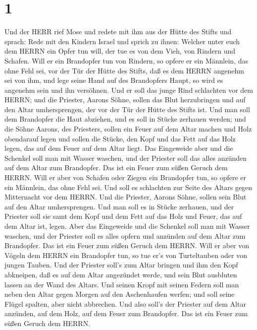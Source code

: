 \hypertarget{section}{%
\section{1}\label{section}}

 Und der HERR rief Mose und redete mit ihm aus der Hütte des
Stifts und sprach:  Rede mit den Kindern Israel und sprich
zu ihnen: Welcher unter euch dem HERRN ein Opfer tun will, der tue es
von dem Vieh, von Rindern und Schafen.  Will er ein
Brandopfer tun von Rindern, so opfere er ein Männlein, das ohne Fehl
sei, vor der Tür der Hütte des Stifts, daß es dem HERRN angenehm sei von
ihm,  und lege seine Hand auf des Brandopfers Haupt, so wird
es angenehm sein und ihn versöhnen.  Und er soll das junge
Rind schlachten vor dem HERRN; und die Priester, Aarons Söhne, sollen
das Blut herzubringen und auf den Altar umhersprengen, der vor der Tür
der Hütte des Stifts ist.  Und man soll dem Brandopfer die
Haut abziehen, und es soll in Stücke zerhauen werden;  und
die Söhne Aarons, des Priesters, sollen ein Feuer auf dem Altar machen
und Holz obendarauf legen  und sollen die Stücke, den Kopf
und das Fett auf das Holz legen, das auf dem Feuer auf dem Altar liegt.
 Das Eingeweide aber und die Schenkel soll man mit Wasser
waschen, und der Priester soll das alles anzünden auf dem Altar zum
Brandopfer. Das ist ein Feuer zum süßen Geruch dem HERRN. 
Will er aber von Schafen oder Ziegen ein Brandopfer tun, so opfere er
ein Männlein, das ohne Fehl sei.  Und soll es schlachten
zur Seite des Altars gegen Mitternacht vor dem HERRN. Und die Priester,
Aarons Söhne, sollen sein Blut auf den Altar umhersprengen.
 Und man soll es in Stücke zerhauen, und der Priester soll
sie samt dem Kopf und dem Fett auf das Holz und Feuer, das auf dem Altar
ist, legen.  Aber das Eingeweide und die Schenkel soll man
mit Wasser waschen, und der Priester soll es alles opfern und anzünden
auf dem Altar zum Brandopfer. Das ist ein Feuer zum süßen Geruch dem
HERRN.  Will er aber von Vögeln dem HERRN ein Brandopfer
tun, so tue er's von Turteltauben oder von jungen Tauben. 
Und der Priester soll's zum Altar bringen und ihm den Kopf abkneipen,
daß es auf dem Altar angezündet werde, und sein Blut ausbluten lassen an
der Wand des Altars.  Und seinen Kropf mit seinen Federn
soll man neben den Altar gegen Morgen auf den Aschenhaufen werfen;
 und soll seine Flügel spalten, aber nicht abbrechen. Und
also soll's der Priester auf dem Altar anzünden, auf dem Holz, auf dem
Feuer zum Brandopfer. Das ist ein Feuer zum süßen Geruch dem HERRN.

